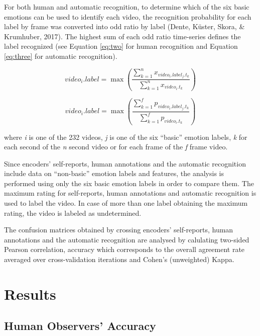 \documentclass[
  english,
  doc]{apa7}
\begin{document}
For both human and automatic recognition, to determine which of the six basic emotions can be used to identify each video, the recognition probability for each label by frame was converted into odd ratio by label (Dente, Küster, Skora, \& Krumhuber, 2017). The highest sum of each odd ratio time-series defines the label recognized (see Equation \eqref{eq:two} for human recognition and Equation \eqref{eq:three} for automatic recognition).

\begin{equation}
video_{i}.label = \max\left(\frac{\sum_{k=1}^{n}x_{video_{i}.label_{j}.t_{k}}}{\sum_{k=1}^{n}x_{video_{i}.t_{k}}}\right)\label{eq:two}
\end{equation}

\begin{equation}
video_{i}.label = \max\left(\frac{\sum_{k=1}^{f}p_{video_{i}.label_{j}.t_{k}}}{\sum_{k=1}^{f}p_{video_{i}.t_{k}}}\right)\label{eq:three}
\end{equation}

where \emph{i} is one of the 232 videos, \emph{j} is one of the six ``basic'' emotion labels, \emph{k} for each second of the \emph{n} second video or for each frame of the \emph{f} frame video.

Since encoders' self-reports, human annotations and the automatic recognition include data on ``non-basic'' emotion labels and features, the analysis is performed using only the six basic emotion labels in order to compare them. The maximum rating for self-reports, human annotations and automatic recognition is used to label the video. In case of more than one label obtaining the maximum rating, the video is labeled as undetermined.

The confusion matrices obtained by crossing encoders' self-reports, human annotations and the automatic recognition are analysed by calulating two-sided Pearson correlation, accuracy which corresponds to the overall agreement rate averaged over cross-validation iterations and Cohen's (unweighted) Kappa.

\hypertarget{results}{%
\section{Results}\label{results}}

\hypertarget{human-observers-accuracy}{%
\subsection{Human Observers' Accuracy}\label{human-observers-accuracy}}
\end{document}
